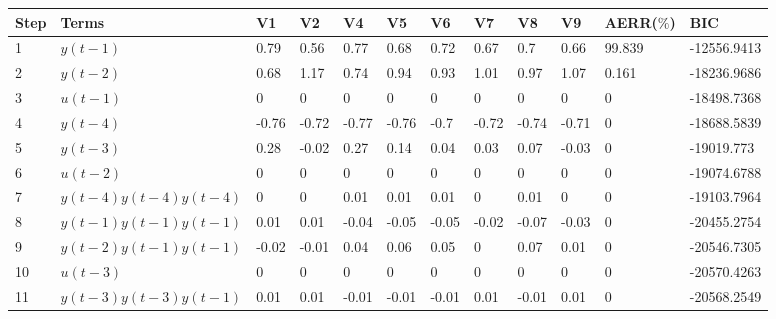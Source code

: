 \begin{tabular}{llllllllllll}
Step & Terms & V1 & V2 & V4 & V5 & V6 & V7 & V8 & V9 & AERR($\%$) & BIC \\ 
\hline 
1 & $y(t-1)$ & 0.79 & 0.56 & 0.77 & 0.68 & 0.72 & 0.67 & 0.7 & 0.66 & 99.839 & -12556.9413 \\ 
2 & $y(t-2)$ & 0.68 & 1.17 & 0.74 & 0.94 & 0.93 & 1.01 & 0.97 & 1.07 & 0.161 & -18236.9686 \\ 
3 & $u(t-1)$ & 0 & 0 & 0 & 0 & 0 & 0 & 0 & 0 & 0 & -18498.7368 \\ 
4 & $y(t-4)$ & -0.76 & -0.72 & -0.77 & -0.76 & -0.7 & -0.72 & -0.74 & -0.71 & 0 & -18688.5839 \\ 
5 & $y(t-3)$ & 0.28 & -0.02 & 0.27 & 0.14 & 0.04 & 0.03 & 0.07 & -0.03 & 0 & -19019.773 \\ 
6 & $u(t-2)$ & 0 & 0 & 0 & 0 & 0 & 0 & 0 & 0 & 0 & -19074.6788 \\ 
7 & $y(t-4)y(t-4)y(t-4)$ & 0 & 0 & 0.01 & 0.01 & 0.01 & 0 & 0.01 & 0 & 0 & -19103.7964 \\ 
8 & $y(t-1)y(t-1)y(t-1)$ & 0.01 & 0.01 & -0.04 & -0.05 & -0.05 & -0.02 & -0.07 & -0.03 & 0 & -20455.2754 \\ 
9 & $y(t-2)y(t-1)y(t-1)$ & -0.02 & -0.01 & 0.04 & 0.06 & 0.05 & 0 & 0.07 & 0.01 & 0 & -20546.7305 \\ 
10 & $u(t-3)$ & 0 & 0 & 0 & 0 & 0 & 0 & 0 & 0 & 0 & -20570.4263 \\ 
11 & $y(t-3)y(t-3)y(t-1)$ & 0.01 & 0.01 & -0.01 & -0.01 & -0.01 & 0.01 & -0.01 & 0.01 & 0 & -20568.2549 \\ 
\hline 
\end{tabular}